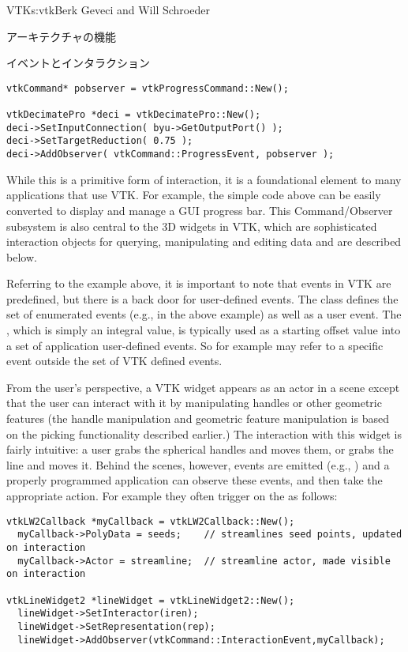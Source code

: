 \begin{aosachapter}{VTK}{s:vtk}{Berk Geveci and Will Schroeder}
\begin{aosasect1}{アーキテクチャの機能}
\begin{aosasect2}{イベントとインタラクション}
\begin{verbatim}
vtkCommand* pobserver = vtkProgressCommand::New();

vtkDecimatePro *deci = vtkDecimatePro::New();
deci->SetInputConnection( byu->GetOutputPort() );
deci->SetTargetReduction( 0.75 );
deci->AddObserver( vtkCommand::ProgressEvent, pobserver );
\end{verbatim}

While this is a primitive form of interaction, it is a foundational
element to many applications that use VTK\@. For example, the simple
code above can be easily converted to display and manage a GUI
progress bar. This Command/Observer subsystem is also central to the
3D widgets in VTK, which are sophisticated interaction objects for
querying, manipulating and editing data and are described below.

Referring to the example above, it is important to note that events in
VTK are predefined, but there is a back door for user-defined
events. The class  defines the set of enumerated
events (e.g.,  in the above example)
as well as a user event. The , which is simply an integral
value, is typically used as a starting offset value into a set of
application user-defined events. So for example
 may refer to a specific event outside
the set of VTK defined events.

From the user's perspective, a VTK widget appears as an actor in a
scene except that the user can interact with it by manipulating
handles or other geometric features (the handle manipulation and
geometric feature manipulation is based on the picking functionality
described earlier.) The interaction with this widget is fairly
intuitive: a user grabs the spherical handles and moves them, or grabs
the line and moves it. Behind the scenes, however, events are emitted
(e.g., ) and a properly programmed application
can observe these events, and then take the appropriate action. For
example they often trigger on the 
as follows:

\begin{verbatim}
vtkLW2Callback *myCallback = vtkLW2Callback::New();
  myCallback->PolyData = seeds;    // streamlines seed points, updated on interaction
  myCallback->Actor = streamline;  // streamline actor, made visible on interaction

vtkLineWidget2 *lineWidget = vtkLineWidget2::New();
  lineWidget->SetInteractor(iren);
  lineWidget->SetRepresentation(rep);
  lineWidget->AddObserver(vtkCommand::InteractionEvent,myCallback);
\end{verbatim}


\end{aosasect2}
\end{aosasect1}
\end{aosachapter}
